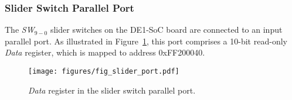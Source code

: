 \subsubsection{Slider Switch Parallel Port}

The {\it SW}$_{9-0}$ slider switches on the DE1-SoC board are connected to an input parallel
port.  As illustrated in Figure~\ref{fig:slider_port}, this port 
comprises a 10-bit read-only {\it Data} register, which is mapped to address {\sf 0xFF200040}.

\begin{figure}[h!]
   \begin{center}
       \texttt{[image: figures/fig\_slider\_port.pdf]}
   \end{center}
   \caption{{\it Data} register in the slider switch parallel port.}
	\label{fig:slider_port}
\end{figure}

